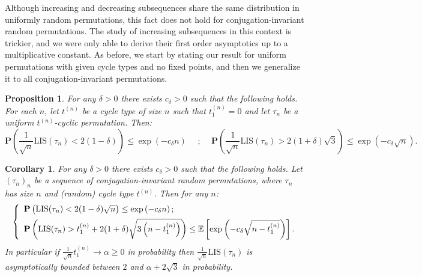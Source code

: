 \documentclass{article}
\newtheorem{prop}[theorem]{Proposition}
\newtheorem{cor}[theorem]{Corollary}
\theoremstyle{remark}
\newcommand{\mean}[1]{\mathbb{E}\left[#1\right]}
\newcommand{\prob}[1]{\mathbf{P}\left(#1\right)}
\def\LIS{\mathrm{LIS}}
\begin{document}
Although increasing and decreasing subsequences share the same distribution in uniformly random permutations, this fact does not hold for conjugation-invariant random permutations.
The study of increasing subsequences in this context is trickier, and we were only able to derive their first order asymptotics up to a multiplicative constant.
As before, we start by stating our result for uniform permutations with given cycle types and no fixed points, and then we generalize it to all conjugation-invariant permutations.

\begin{prop}\label{th: LIS t-cyclic}
    For any $\delta>0$ there exists $c_\delta>0$ such that the following holds.
    For each $n$, let $t^{(n)}$ be a cycle type of size $n$ such that $t_1^{(n)}=0$ and let $\tau_n$ be a uniform $t^{(n)}$-cyclic permutation.
    Then:
    \begin{equation*}
        \prob{\frac{1}{\sqrt{n}} \LIS(\tau_n) < 2(1-\delta) } \le \exp\left(-c_\delta n\right)
        \quad\text{ ; }\quad
        \prob{\frac{1}{\sqrt{n}} \LIS(\tau_n) > 2(1+\delta)\sqrt{3} } \le \exp\left(-c_\delta \sqrt{n}\right).
    \end{equation*}
\end{prop}

\begin{cor}\label{cor: LIS conjugation-invariant}
    For any $\delta>0$ there exists $c_\delta>0$ such that the following holds.
    Let $(\tau_n)_n$ be a sequence of conjugation-invariant random permutations, where $\tau_n$ has size $n$ and (random) cycle type $t^{(n)}$.
    Then for any $n$:
    \begin{equation*}
    \left\{
        \begin{array}{ll}
        \prob{\big.\LIS(\tau_n) < 2(1-\delta)\sqrt{n}}
        \le \exp\left(-c_\delta n\right) ;\vspace{.5em}\\
        \prob{\LIS(\tau_n) > t_1^{(n)} + 2(1+\delta)\sqrt{3\left(n-t_1^{(n)}\right)}}
        \le \mean{\exp\left(-c_\delta \sqrt{n-t_1^{(n)}}\right)} .
        \end{array}
    \right.
    \end{equation*}
    In particular if $\frac{1}{\sqrt n}t_1^{(n)}\to\alpha\ge0$ in probability then $\frac{1}{\sqrt n}\LIS(\tau_n)$ is asymptotically bounded between $2$ and $\alpha+2\sqrt 3$ in probability.
\end{cor}
\end{document}
